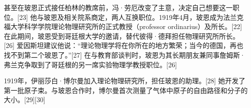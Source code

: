 甚至在玻恩正式接任柏林的教席前，冯·劳厄改变了主意，决定自己想要这一职位。[23] 他与玻恩及相关院系商定，两人互换职位。1919年4月，玻恩成为法兰克福大学科学学院理论物理研究所的正式教授（professor ordinarius）及所长。[22] 在此期间，玻恩受到哥廷根大学的邀请，替代彼得·德拜担任物理研究所所长。[26] 爱因斯坦建议他说：“理论物理学将在你所在的地方繁荣；当今的德国，再也找不到第二个玻恩了。”[27] 在与教育部谈判时，玻恩为其长期朋友兼同事詹姆斯·弗兰克争取到了哥廷根的另一席实验物理学教授职位。[26]  

1919年，伊丽莎白·博尔曼加入理论物理研究所，担任玻恩的助理。[28] 她开发了第一批原子束。与玻恩合作时，博尔曼首次测量了气体中原子的自由路径和分子的大小。[29][30]